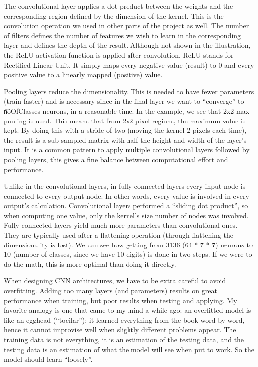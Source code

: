 The convolutional layer applies a dot product between the weights and the corresponding region defined by the dimension of the kernel. This is the convolution operation we used in other parts of the project as well. The number of filters defines the number of features we wish to learn in the corresponding layer and defines the depth of the result. Although not shown in the illustration, the ReLU activation function is applied after convolution. ReLU stands for Rectified Linear Unit. It simply maps every negative value (result) to 0 and every positive value to a linearly mapped (positive) value.

Pooling layers reduce the dimensionality. This is needed to have fewer parameters (train faster) and is necessary since in the final layer we want to ``converge'' to \t{noOfClasses} neurons, in a reasonable time. In the example, we see that 2x2 max-pooling is used. This means that from 2x2 pixel regions, the maximum value is kept. By doing this with a stride of two (moving the kernel 2 pixels each time), the result is a sub-sampled matrix with half the height and width of the layer's input. It is a common pattern to apply multiple convolutional layers followed by pooling layers, this gives a fine balance between computational effort and performance.

Unlike in the convolutional layers, in fully connected layers every input node is connected to every output node. In other words, every value is involved in every output's calculation. Convolutional layers performed a ``sliding dot product'', so when computing one value, only the kernel's size number of nodes was involved. Fully connected layers yield much more parameters than convolutional ones. They are typically used after a flattening operation (through flattening the dimensionality is lost). We can see how getting from 3136 (64 * 7 * 7) neurons to 10 (number of classes, since we have 10 digits) is done in two steps. If we were to do the math, this is more optimal than doing it directly.

When designing CNN architectures, we have to be extra careful to avoid overfitting. Adding too many layers (and parameters) results on great performance when training, but poor results when testing and applying. My favorite analogy is one that came to my mind a while ago: an overfitted model is like an egghead (``tocilar''): it learned everything from the book word by word, hence it cannot improvise well when slightly different problems appear. The training data is not everything, it is an estimation of the testing data, and the testing data is an estimation of what the model will see when put to work. So the model should learn ``loosely''.

